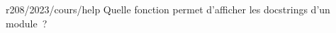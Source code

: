 \begin{question}{r208/2023/cours/help}
Quelle fonction permet d'afficher les docstrings d'un
module~?
%
\begin{reponses}
\end{reponses}
\end{question}
